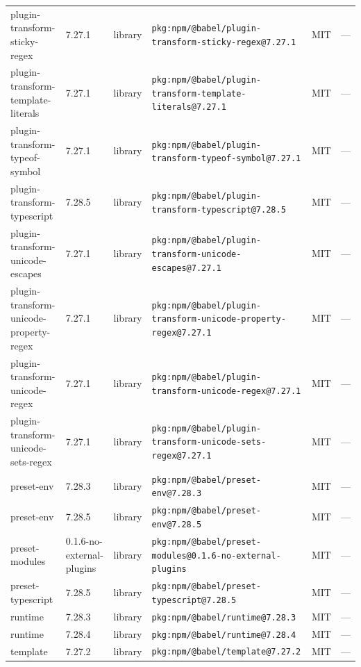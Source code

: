 \documentclass[11pt,a4paper]{article}
\begin{document}
\begin{longtable}{|p{4cm}|p{2cm}|p{1.6cm}|p{5cm}|p{1.5cm}|p{3.5cm}|}
\raggedright plugin-transform-sticky-regex & 7.27.1 & library & \small\texttt{pkg:npm/@babel/plugin-transform-sticky-regex@7.27.1} & MIT & \small — \\
\raggedright plugin-transform-template-literals & 7.27.1 & library & \small\texttt{pkg:npm/@babel/plugin-transform-template-literals@7.27.1} & MIT & \small — \\
\raggedright plugin-transform-typeof-symbol & 7.27.1 & library & \small\texttt{pkg:npm/@babel/plugin-transform-typeof-symbol@7.27.1} & MIT & \small — \\
\raggedright plugin-transform-typescript & 7.28.5 & library & \small\texttt{pkg:npm/@babel/plugin-transform-typescript@7.28.5} & MIT & \small — \\
\raggedright plugin-transform-unicode-escapes & 7.27.1 & library & \small\texttt{pkg:npm/@babel/plugin-transform-unicode-escapes@7.27.1} & MIT & \small — \\
\raggedright plugin-transform-unicode-property-regex & 7.27.1 & library & \small\texttt{pkg:npm/@babel/plugin-transform-unicode-property-regex@7.27.1} & MIT & \small — \\
\raggedright plugin-transform-unicode-regex & 7.27.1 & library & \small\texttt{pkg:npm/@babel/plugin-transform-unicode-regex@7.27.1} & MIT & \small — \\
\raggedright plugin-transform-unicode-sets-regex & 7.27.1 & library & \small\texttt{pkg:npm/@babel/plugin-transform-unicode-sets-regex@7.27.1} & MIT & \small — \\
\raggedright preset-env & 7.28.3 & library & \small\texttt{pkg:npm/@babel/preset-env@7.28.3} & MIT & \small — \\
\raggedright preset-env & 7.28.5 & library & \small\texttt{pkg:npm/@babel/preset-env@7.28.5} & MIT & \small — \\
\raggedright preset-modules & 0.1.6-no-external-plugins & library & \small\texttt{pkg:npm/@babel/preset-modules@0.1.6-no-external-plugins} & MIT & \small — \\
\raggedright preset-typescript & 7.28.5 & library & \small\texttt{pkg:npm/@babel/preset-typescript@7.28.5} & MIT & \small — \\
\raggedright runtime & 7.28.3 & library & \small\texttt{pkg:npm/@babel/runtime@7.28.3} & MIT & \small — \\
\raggedright runtime & 7.28.4 & library & \small\texttt{pkg:npm/@babel/runtime@7.28.4} & MIT & \small — \\
\raggedright template & 7.27.2 & library & \small\texttt{pkg:npm/@babel/template@7.27.2} & MIT & \small — \\

\end{longtable}
\end{document}
